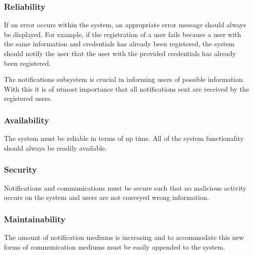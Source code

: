 \documentclass{article}
\begin{document}
\subsubsection{Reliability}    
    \begin{flushleft}
    If an error occurs within the system, an appropriate error message should always be displayed. For example, if the registration of a user fails because a user with the same information and credentials has already been registered, the system should notify the user that the user with the provided credentials has already been registered.
\bigskip

    The notifications subsystem is crucial in informing users of possible information. With this it is of utmost importance that all notifications sent are received by the registered users.
    \end{flushleft}
    
    	\subsubsection{Availability}    
    \begin{flushleft}
    The system must be reliable in terms of up time. All of the system functionality should always be readily available.
    \end{flushleft}
    
    	\subsubsection{Security}    
    \begin{flushleft}
    Notifications and communications must be secure such that no malicious activity occurs on the system and users are not conveyed wrong information.
    \end{flushleft}
    
    	\subsubsection{Maintainability}    
    \begin{flushleft}
    The amount of notification mediums is increasing and to accommodate this new forms of communication mediums must be easily appended to the system.
    \end{flushleft}
     \clearpage
     
\end{document}
